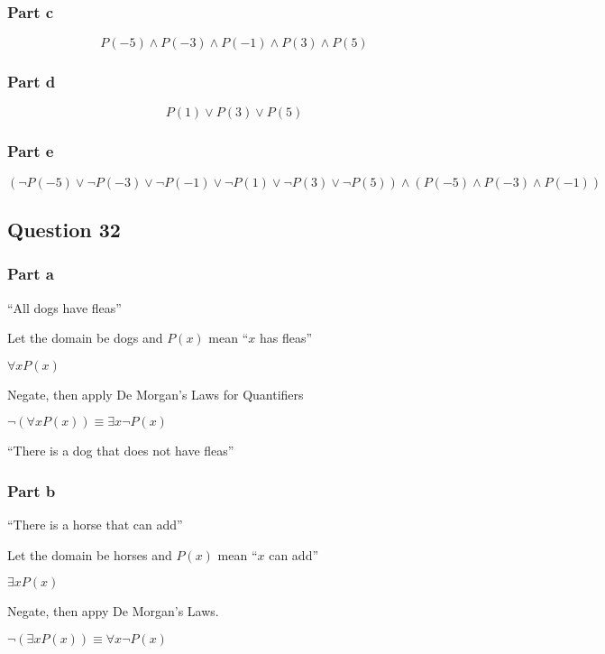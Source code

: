 \documentclass[12pt]{article}
\begin{document}
\subsubsection*{Part c}

\[
P(-5) \land P(-3) \land P(-1) \land P(3) \land P(5)
\]

\subsubsection*{Part d}

\[
P(1) \lor P(3) \lor P(5)
\]

\subsubsection*{Part e}

\[
(\neg P(-5) \lor \neg P(-3) \lor \neg P(-1) \lor \neg P(1) \lor \neg P(3)
\lor \neg P(5)) \land (P(-5) \land P(-3) \land P(-1))
\]

\subsection*{Question 32}

\subsubsection*{Part a}

\enquote{All dogs have fleas}

Let the domain be dogs and $P(x)$ mean \enquote{$x$ has fleas}

$\forall x P(x)$

Negate, then apply De Morgan's Laws for Quantifiers

$\neg (\forall x P(x)) \equiv \exists x \neg P(x)$

\enquote{There is a dog that does not have fleas}

\subsubsection*{Part b}

\enquote{There is a horse that can add}

Let the domain be horses and $P(x)$ mean \enquote{$x$ can add}

$\exists x P(x)$

Negate, then appy De Morgan's Laws.

$\neg (\exists x P(x)) \equiv \forall x \neg P(x)$
\end{document}
